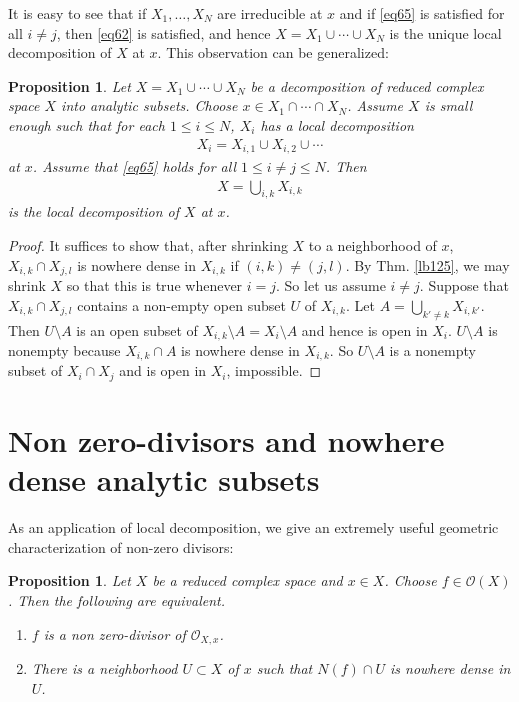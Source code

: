 \documentclass[12pt,b5paper,notitlepage]{report}
\theoremstyle{definition}
\theoremstyle{plain}
\newtheorem{pp}[df]{Proposition}
\newcommand{\scr}{\mathscr}
\numberwithin{equation}{section}
\begin{document}
It is easy to see that if $X_1,\dots,X_N$ are irreducible at $x$ and if \eqref{eq65} is satisfied for all $i\neq j$, then \eqref{eq62} is satisfied, and hence $X=X_1\cup\cdots\cup X_N$ is the unique local decomposition of $X$ at $x$. This observation can be generalized:

\begin{pp}\label{lb214}
Let $X=X_1\cup\cdots\cup X_N$ be a decomposition of reduced complex space $X$ into analytic subsets. Choose $x\in X_1\cap\cdots\cap X_N$. Assume $X$ is small enough such that for each $1\leq i\leq N$, $X_i$ has a local decomposition
\begin{align*}
X_i=X_{i,1}\cup X_{i,2}\cup\cdots
\end{align*}
at $x$. Assume that \eqref{eq65} holds for all $1\leq i\neq j\leq N$. Then
\begin{align*}
X=\bigcup_{i,k}X_{i,k}
\end{align*}
is the local decomposition of $X$ at $x$.
\end{pp}

\begin{proof}
It suffices to show that, after shrinking $X$ to a neighborhood of $x$, $X_{i,k}\cap X_{j,l}$ is nowhere dense in $X_{i,k}$ if $(i,k)\neq (j,l)$. By Thm. \ref{lb125}, we may shrink $X$ so that this is true whenever $i=j$. So let us assume $i\neq j$. Suppose that $X_{i,k}\cap X_{j,l}$ contains a non-empty open subset $U$ of $X_{i,k}$.  Let $A=\bigcup_{k'\neq k}X_{i,k'}$. Then $U\setminus A$ is an open subset of $X_{i,k}\setminus A=X_i\setminus A$ and hence is open in $X_i$. $U\setminus A$ is nonempty because $X_{i,k}\cap A$ is nowhere dense in $X_{i,k}$. So $U\setminus A$ is a nonempty subset of $X_i\cap X_j$ and is open in $X_i$, impossible.
\end{proof}









\section{Non zero-divisors and nowhere dense analytic subsets}\label{lb126}


As an application of local decomposition, we give an extremely useful geometric characterization of non-zero divisors:





\begin{pp}\label{lb121}
Let $X$ be a reduced complex space and $x\in X$. Choose $f\in\scr O(X)$. Then the following are equivalent. 
\begin{enumerate}[label=(\arabic*)]
\item $f$ is a non zero-divisor of $\scr O_{X,x}$.
\item There is a neighborhood $U\subset X$ of $x$ such that $N(f)\cap U$ is nowhere dense in $U$.
\end{enumerate}
\end{pp}
\end{document}
